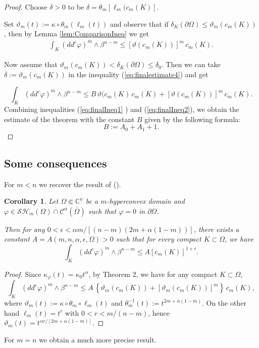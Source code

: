 \documentclass[12pt]{amsart}
\newtheorem{corollary}[theorem]{Corollary}
\theoremstyle{definition}
\numberwithin{theorem}{section}
\numberwithin{equation}{section}
\newcommand{\C}{\mathbb{C}}
\begin{document}
{\begin{proof}
Choose $\delta >0$ to be  $\delta = \theta_m\left[\ell_m (c_m(K)\right]$. 

Set $\vartheta_m (t) := \kappa \circ \theta_m (\ell_m (t))$ and observe that if $ \delta_K(\partial \Omega) \leq \vartheta_m  (c_m(K))$, then by Lemma \ref{lem:ComparisonIneq} we get
 \begin{eqnarray} \label{eq:finalIneq1}
   \int_{K}(dd^c\varphi)^m\wedge\beta^{n-m}  \leq  [\vartheta (c_m(K))]^m \, c_m (K).
  \end{eqnarray}
 
  Now assume that $ \vartheta_m  (c_m(K)) < \delta_K (\partial \Omega) \leq \delta_0$. Then we can take $\delta := \vartheta_m  (c_m(K))$ in the  inequality (\ref{eq:finalestimate4}) and get
  
  \begin{equation}\label{eq:finalIneq2}
   \int_{K}(dd^c\varphi)^m\wedge\beta^{n-m} \leq B \, \vartheta (c_m (K) \, c_m (K)  + [\vartheta (c_m (K))]^m \,  c_m (K).
  \end{equation}
  Combining inequalities  (\ref{eq:finalIneq1} ) and (\ref{eq:finalIneq2}), we obtain the estimate of the theorem with the constant $B$ given by the following formula:
  \begin{equation} \label{eq:finalConst}
   B := A_0  + A_1 + 1.
\end{equation}   
\end{proof}


\subsection{Some consequences}

For $m < n$ we recover the result of (\cite{BZ20}).
\begin{corollary}  Let $\Omega \Subset \C^n$ be a $m$-hyperconvex  domain and $\varphi\in \mathcal{SH}_m (\Omega)\cap \mathcal{C}^{\alpha} (\overline\Omega)$ such that $\varphi = 0$ in $\partial \Omega$.  

 Then for any  $0 < \epsilon <\alpha m \slash  [ (n-m) (2m + \alpha (1-m))]$,  there exists a constant $ A = A (m,n,\alpha, \epsilon, \Omega)>0$ such that for every compact $K\subset\Omega$, we have
$$
\int_ K (dd^c\varphi)^m \wedge \beta^{n-m} \leq A \left[\text{c}_m (K)\right] ^{1 + \epsilon}.
$$ 

\end{corollary}

\begin{proof}
Since $\kappa_\varphi (t) = \kappa_0 t^{\alpha}$, by Theorem 2, we have for any compact $K \subset \Omega$,
$$
\int_{K}(dd^c\varphi)^m\wedge\beta^{n-m}  \leq  A  \, \left\{\vartheta_m  (c_m (K)) + \left[\vartheta_m  (c_m (K))\right]^m\right\} \, c_m (K),
$$
where
$\vartheta_m (t) := \kappa \circ \theta_m \circ \ell_m (t)$ and $\theta_m^{-1} (t) := t^{2 m+ \alpha(1 - m)}$. 
On the other hand $\ell_m (t) = t^{r}$ with $0 < r < m \slash (n-m)$, hence $\vartheta_m (t) = t^{\alpha r \slash [2m + \alpha (1-m)]}$.
\end{proof}
For $m=n$ we obtain a much more precise result.

}
\end{document}
